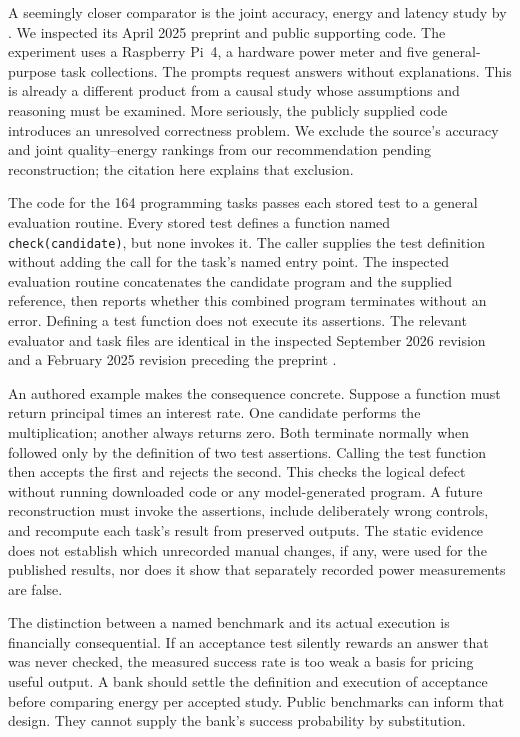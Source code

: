 A seemingly closer comparator is the joint accuracy, energy and latency
study by \citet{closureHusom2025}. We inspected its April 2025 preprint and
public supporting code. The experiment uses a Raspberry Pi~4, a hardware
power meter and five general-purpose task collections. The prompts request
answers without explanations. This is already a different product from a
causal study whose assumptions and reasoning must be examined. More seriously,
the publicly supplied code introduces an unresolved correctness problem.
We exclude the source's accuracy and joint quality--energy rankings from our
recommendation pending reconstruction; the citation here explains that
exclusion.

The code for the 164 programming tasks passes each stored test to a general
evaluation routine. Every stored test defines a function named
\texttt{check(candidate)}, but none invokes it. The caller supplies the test
definition without adding the call for the task's named entry point. The
inspected evaluation routine concatenates the candidate program and the
supplied reference, then reports whether this combined program terminates
without an error. Defining a test function does not execute its assertions.
The relevant evaluator and task files are identical in the inspected
September 2026 revision and a February 2025 revision preceding the preprint
\citep{closureEdgeCode2026,closureCodeEval2022}.

An authored example makes the consequence concrete. Suppose a function must
return principal times an interest rate. One candidate performs the
multiplication; another always returns zero. Both terminate normally when
followed only by the definition of two test assertions. Calling the test
function then accepts the first and rejects the second. This checks the
logical defect without running downloaded code or any model-generated
program. A future reconstruction must invoke the assertions, include
deliberately wrong controls, and recompute each task's result from preserved
outputs. The static evidence does not establish which unrecorded manual
changes, if any, were used for the published results, nor does it show that
separately recorded power measurements are false.

The distinction between a named benchmark and its actual execution is
financially consequential. If an acceptance test silently rewards an answer
that was never checked, the measured success rate is too weak a basis for
pricing useful output. A bank should settle the definition and execution of
acceptance before comparing energy per accepted study. Public benchmarks
can inform that design. They cannot supply the bank's success probability
by substitution.


